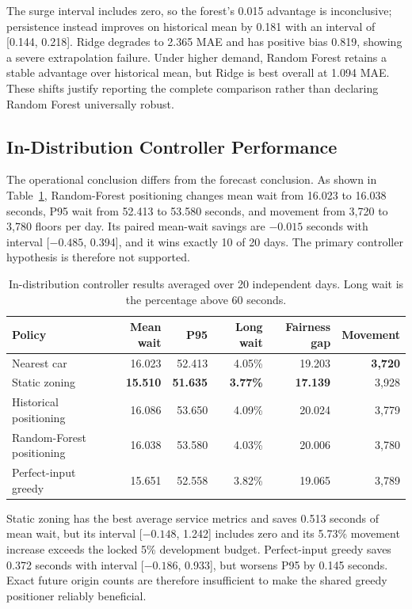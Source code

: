 \documentclass[12pt]{article}
\begin{document}
The surge interval includes zero, so the forest's 0.015 advantage is
inconclusive; persistence instead improves on historical mean by 0.181 with an
interval of [0.144, 0.218]. Ridge degrades to 2.365 MAE and has positive bias
0.819, showing a severe extrapolation failure. Under higher demand, Random
Forest retains a stable advantage over historical mean, but Ridge is best
overall at 1.094 MAE. These shifts justify reporting the complete comparison
rather than declaring Random Forest universally robust.

\subsection{In-Distribution Controller Performance}

The operational conclusion differs from the forecast conclusion. As shown in
Table~\ref{tab:final-controller-all}, Random-Forest positioning changes mean
wait from 16.023 to 16.038 seconds, P95 wait from 52.413 to 53.580 seconds, and
movement from 3,720 to 3,780 floors per day. Its paired mean-wait savings are
$-0.015$ seconds with interval [$-0.485$, 0.394], and it wins exactly 10 of 20
days. The primary controller hypothesis is therefore not supported.

\begin{table}[H]
  \centering
  \caption{In-distribution controller results averaged over 20 independent
  days. Long wait is the percentage above 60 seconds.}
  \label{tab:final-controller-all}
  \begin{tabular}{@{}lrrrrr@{}}
    \toprule
    Policy & Mean wait & P95 & Long wait & Fairness gap & Movement \\
    \midrule
    Nearest car & 16.023 & 52.413 & 4.05\% & 19.203 & \textbf{3,720} \\
    Static zoning & \textbf{15.510} & \textbf{51.635} & \textbf{3.77\%} &
      \textbf{17.139} & 3,928 \\
    Historical positioning & 16.086 & 53.650 & 4.09\% & 20.024 & 3,779 \\
    Random-Forest positioning & 16.038 & 53.580 & 4.03\% & 20.006 & 3,780 \\
    Perfect-input greedy & 15.651 & 52.558 & 3.82\% & 19.065 & 3,789 \\
    \bottomrule
  \end{tabular}
\end{table}

Static zoning has the best average service metrics and saves 0.513 seconds of
mean wait, but its interval [$-0.148$, 1.242] includes zero and its 5.73\%
movement increase exceeds the locked 5\% development budget. Perfect-input
greedy saves 0.372 seconds with interval [$-0.186$, 0.933], but worsens P95 by
0.145 seconds. Exact future origin counts are therefore insufficient to make
the shared greedy positioner reliably beneficial.
\end{document}
